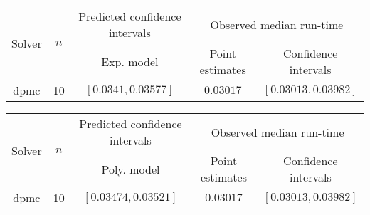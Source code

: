 \begin{tabular}{ccccc}
\hline 
\multirow{2}{*}{Solver} & \multirow{2}{*}{$n$} & Predicted confidence intervals & \multicolumn{2}{c}{Observed median  run-time}\tabularnewline
 &  & Exp. model  & Point estimates  & Confidence intervals\tabularnewline
\hline 
\hline 
\multirow{0}{*}{dpmc} & 10 & $\mathbf{\left[0.0341,0.03577\right]}$ & $0.03017$ & $\left[0.03013,0.03982\right]$ \tabularnewline 
\hline 
\end{tabular} 

\begin{tabular}{ccccc}
\hline 
\multirow{2}{*}{Solver} & \multirow{2}{*}{$n$} & Predicted confidence intervals & \multicolumn{2}{c}{Observed median  run-time}\tabularnewline
 &  & Poly. model  & Point estimates  & Confidence intervals\tabularnewline
\hline 
\hline 
\multirow{0}{*}{dpmc} & 10 & $\mathbf{\left[0.03474,0.03521\right]}$ & $0.03017$ & $\left[0.03013,0.03982\right]$ \tabularnewline 
\hline 
\end{tabular} 


